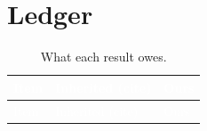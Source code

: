 \documentclass[11pt,a4paper]{article}
\theoremstyle{definition}
\begin{document}
\section{Ledger}\label{sec:ledger}
{\small
\begin{longtable}{p{6.2cm}p{4.2cm}p{4.2cm}}
\caption{What each result owes.}\label{tab:ledger}\\
\toprule
\rowcolor{hdrblue}
\textcolor{white}{Item} & \textcolor{white}{Inherited (cite)} & \textcolor{white}{Ours}\\
\midrule
\endfirsthead
\toprule
\rowcolor{hdrblue}
\textcolor{white}{Item} & \textcolor{white}{Inherited (cite)} & \textcolor{white}{Ours}\\
\midrule
\endhead


\end{longtable}}
\end{document}
